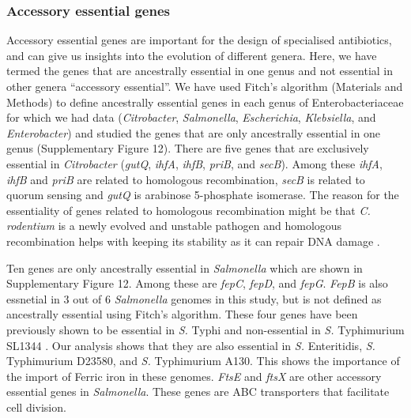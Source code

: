 \documentclass[12pt,letterpaper]{article}
\begin{document}
\subsubsection{Accessory essential genes}
Accessory essential genes are important for the design of specialised antibiotics, and can give us insights into the evolution of different genera. Here, we have termed the genes that are ancestrally essential in one genus and not essential in other genera ``accessory essential''. We have used Fitch's algorithm (Materials and Methods) to define ancestrally essential genes in each genus of Enterobacteriaceae for which we had data (\textit{Citrobacter}, \textit{Salmonella}, \textit{Escherichia}, \textit{Klebsiella}, and \textit{Enterobacter}) and studied the genes that are only ancestrally essential in one genus (Supplementary Figure 12). There are five genes that are exclusively essential in \textit{Citrobacter} (\textit{gutQ}, \textit{ihfA}, \textit{ihfB}, \textit{priB}, and \textit{secB}). Among these \textit{ihfA}, \textit{ihfB} and \textit{priB} are related to homologous recombination, \textit{secB} is related to quorum sensing and \textit{gutQ} is arabinose 5-phosphate isomerase. The reason for the essentiality of genes related to homologous recombination might be that \textit{C. rodentium} is a newly evolved and unstable pathogen \cite{petty_citrobacter_2011} and homologous recombination helps with keeping its stability as it can repair DNA damage \cite{darmon_bacterial_2014}.

Ten genes are only ancestrally essential in \textit{Salmonella} which are shown in Supplementary Figure 12. Among these are \textit{fepC}, \textit{fepD}, and \textit{fepG}. \textit{FepB} is also essnetial in 3 out of 6 \textit{Salmonella} genomes in this study, but is not defined as ancestrally essential using Fitch's algorithm. These four genes have been previously shown to be essential in \textit{S.} Typhi and non-essential in \textit{S.} Typhimurium SL1344 \cite{barquist_comparison_2013}. Our analysis shows that they are also essential in \textit{S.} Enteritidis, \textit{S.} Typhimurium D23580, and \textit{S.} Typhimurium A130. This shows the importance of the import of Ferric iron in these genomes. \textit{FtsE} and \textit{ftsX} are other accessory essential genes in \textit{Salmonella}. These genes are ABC transporters that facilitate cell division.%
\end{document}
